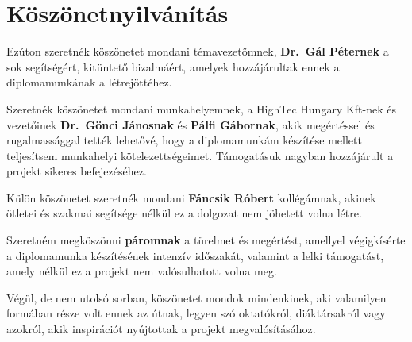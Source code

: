 \chapter*{Köszönetnyilvánítás}
\vspace{2 cm}

Ezúton szeretnék köszönetet mondani témavezetőmnek, \textbf{Dr.\ Gál Péternek} a sok segítségért, kitüntető bizalmáért,
amelyek hozzájárultak ennek a diplomamunkának a létrejöttéhez.

Szeretnék köszönetet mondani munkahelyemnek, a HighTec Hungary Kft-nek és vezetőinek \textbf{Dr.\ Gönci Jánosnak} és
\textbf{Pálfi Gábornak}, akik megértéssel és rugalmassággal tették lehetővé, hogy a diplomamunkám készítése mellett
teljesítsem munkahelyi kötelezettségeimet. Támogatásuk nagyban hozzájárult a projekt sikeres befejezéséhez.

Külön köszönetet szeretnék mondani \textbf{Fáncsik Róbert} kollégámnak, akinek ötletei és szakmai segítsége nélkül ez a
dolgozat nem jöhetett volna létre.

Szeretném megköszönni \textbf{páromnak} a türelmet és megértést, amellyel végigkísérte a diplomamunka készítésének
intenzív időszakát, valamint a lelki támogatást, amely nélkül ez a projekt nem valósulhatott volna meg.

Végül, de nem utolsó sorban, köszönetet mondok mindenkinek, aki valamilyen formában része volt ennek az útnak, legyen
szó oktatókról, diáktársakról vagy azokról, akik inspirációt nyújtottak a projekt megvalósításához.

